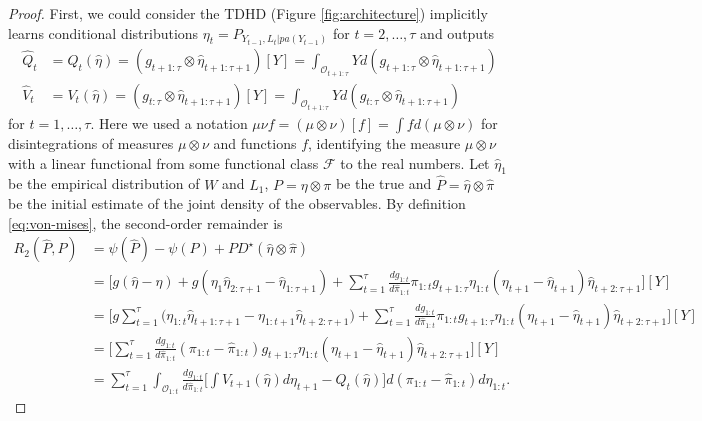 \documentclass{article}
\theoremstyle{plain}
\theoremstyle{definition}
\theoremstyle{remark}
\begin{document}
\begin{proof}
    First, we could consider the TDHD (Figure \ref{fig:architecture}) implicitly learns conditional distributions $\eta_{t}=P_{Y_{t-1},L_{t}|pa(Y_{t-1})}$ for $t=2,\ldots,\tau$ and outputs 
\begin{align}
    \hat{Q}_t&=Q_t(\hat{\eta})=(g_{t+1:\tau}\otimes\hat{\eta}_{t+1:\tau+1})[Y] = \int_{\mathcal{O}_{t+1:\tau}} Yd(g_{t+1:\tau}\otimes\hat{\eta}_{t+1:\tau+1})\\ 
    \hat{V}_t&=V_t(\hat{\eta})=(g_{t:\tau}\otimes\hat{\eta}_{t+1:\tau+1})[Y] =\int_{\mathcal{O}_{t+1:\tau}} Yd(g_{t:\tau}\otimes\hat{\eta}_{t+1:\tau+1})
\end{align}
for $t=1,\ldots,\tau$. Here we used a notation $\mu\nu f=(\mu\otimes\nu)[f]=\int fd(\mu\otimes\nu)$ for disintegrations of measures $\mu\otimes\nu$ and functions $f$, identifying the measure $\mu\otimes\nu$ with a linear functional from some functional class $\mathcal{F}$ to the real numbers. Let $\hat{\eta}_1$ be the empirical distribution of $W$ and $L_1$, $P=\eta\otimes\pi$ be the true and $\hat{P}=\hat{\eta} \otimes\hat{\pi}$ be the initial estimate of the joint density of the observables. By definition \eqref{eq:von-mises}, the second-order remainder is
\begin{equation}
    \label{eq:remainder}
\begin{aligned}
    R_2(\hat{P},P)&=\psi(\hat{P})-\psi(P)+PD^\star(\hat{\eta}\otimes\hat{\pi}) \\
    &= \Big[g(\hat\eta-\eta)+g(\eta_1\hat{\eta}_{2:\tau+1}-\hat{\eta}_{1:\tau+1})+\sum_{t=1}^\tau\frac{dg_{1:t}}{d\hat{\pi}_{1:t}}\pi_{1:t}g_{t+1:\tau}\eta_{1:t}(\eta_{t+1}-\hat{\eta}_{t+1})
    \hat{\eta}_{t+2:\tau+1}\Big][Y] \\
    &= \Big[g\sum_{t=1}^\tau\big(\eta_{1:t}\hat{\eta}_{t+1:\tau+1}-\eta_{1:t+1}\hat{\eta}_{t+2:\tau+1}\big)+\sum_{t=1}^\tau\frac{dg_{1:t}}{d\hat{\pi}_{1:t}}\pi_{1:t}g_{t+1:\tau}\eta_{1:t}(\eta_{t+1}-\hat{\eta}_{t+1})
    \hat{\eta}_{t+2:\tau+1}\Big][Y] \\
    & = \Big[\sum_{t=1}^\tau\frac{dg_{1:t}}{d\hat{\pi}_{1:t}}(\pi_{1:t}-\hat{\pi}_{1:t})g_{t+1:\tau}\eta_{1:t}(\eta_{t+1}-\hat{\eta}_{t+1})
    \hat{\eta}_{t+2:\tau+1}\Big][Y] \\
    &=\sum_{t=1}^\tau\int_{\mathcal{O}_{1:t}}\frac{dg_{1:t}}{d\hat{\pi}_{1:t}}\Big[\int V_{t+1}(\hat{\eta})d\eta_{t+1}-Q_{t}(\hat{\eta})\Big]d(\pi_{1:t}-\hat{\pi}_{1:t})d\eta_{1:t}.
\end{aligned}
\end{equation}
\end{proof}
\end{document}
